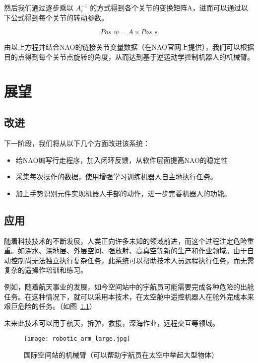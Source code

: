 然后我们通过逐步乘以 $ A_i^{-1} $ 的方式得到各个关节的变换矩阵A，进而可以通过以下公式得到每个关节的转动参数。

\begin{equation}
{Pos\_w = A} \times {Pos\_s}
\end{equation}

由以上方程并结合NAO的链接关节变量数据（在NAO官网上提供），我们可以根据目的点得到每个关节点旋转的角度，从而达到基于逆运动学控制机器人的机械臂。


\chapter{展望}

\section{改进}
下一阶段，我们将从以下几个方面改进该系统：
\begin{itemize}
    \item 给NAO编写行走程序，加入闭环反馈，从软件层面提高NAO的稳定性
    \item 采集每次操作的数据，使用增强学习训练机器人自主地执行任务。
    \item 加上手势识别元件实现机器人手部的动作，进一步完善机器人的功能。
\end{itemize}

\section{应用}

随着科技技术的不断发展，人类正向许多未知的领域前进，而这个过程注定危险重重。如深水、深地层、外层空间、强放射、高真空等新的生产和作业领域。由于自动控制尚无法独立执行复杂任务，此系统可以帮助技术人员远程执行任务，而无需复杂的遥操作培训和练习。

例如，随着航天事业的发展，如今空间站中的宇航员可能需要完成各种危险的出舱任务。在这种情况下，就可以采用本技术，在太空舱中遥控机器人在舱外完成本来艰巨危险的任务。（如图~\ref{arm}）

未来此技术可以用于航天，拆弹，救援，深海作业，远程交互等领域。

\begin{figure}[htbp]
\small
\centering
\texttt{[image: robotic\_arm\_large.jpg]}
\caption{国际空间站的机械臂（可以帮助宇航员在太空中举起大型物体）} 
\label{arm}
\end{figure}

